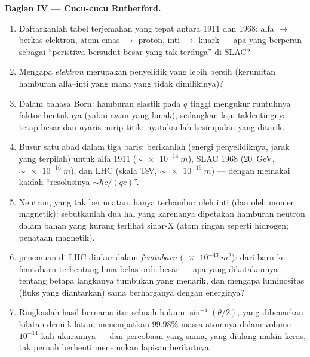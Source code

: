 \begin{problem}
\medskip\noindent\textbf{Bagian IV --- Cucu-cucu Rutherford.}
\begin{enumerate}[resume]
  \item Daftarkanlah tabel terjemahan yang tepat antara 1911 dan 1968:
        alfa $\to$ berkas elektron, atom emas $\to$ proton,
        inti $\to$ kuark --- apa yang berperan sebagai ``peristiwa
        bersudut besar yang tak terduga'' di SLAC?
  \item Mengapa \emph{elektron} merupakan penyelidik yang lebih bersih
        (kerumitan hamburan alfa--inti yang mana yang tidak dimilikinya)?
  \item Dalam bahasa Born: hamburan elastik pada $q$ tinggi mengukur
        runtuhnya faktor bentuknya (yakni awan yang lunak), sedangkan
        laju taklentingnya tetap besar dan nyaris mirip titik:
        nyatakanlah kesimpulan yang ditarik.
  \item Busur satu abad dalam tiga baris: berikanlah (energi
        penyelidiknya, jarak yang terpilah) untuk alfa 1911
        ($\sim\qty{e-14}{m}$), SLAC 1968 (\qty{20}{GeV},
        $\sim\qty{e-16}{m}$), dan LHC (skala TeV, $\sim\qty{e-19}{m}$)
        --- dengan memakai kaidah ``resolusinya $\sim \hbar c/(qc)$''.
  \item Neutron, yang tak bermuatan, hanya terhambur oleh inti (dan oleh
        momen magnetik): sebutkanlah dua hal yang karenanya dipetakan
        hamburan neutron dalam bahan yang kurang terlihat sinar-X (atom
        ringan seperti hidrogen; penataan magnetik).
  \item {} penemuan di LHC diukur dalam
        \emph{femtobarn} ($\qty{e-43}{m^2}$): dari barn ke femtobarn
        terbentang lima belas orde besar --- apa yang dikatakannya
        tentang betapa langkanya tumbukan yang menarik, dan mengapa
        luminositas (fluks yang diantarkan) sama berharganya dengan
        energinya?
  \item Ringkaslah hasil bernama itu: sebuah hukum
        $\sin^{-4}(\theta/2)$, yang dibenarkan kilatan demi kilatan,
        menempatkan $99.98\%$ massa atomnya dalam volume $10^{-14}$
        kali ukurannya --- dan percobaan yang sama, yang diulang makin
        keras, tak pernah berhenti menemukan lapisan berikutnya.
\end{enumerate}
\end{problem}
